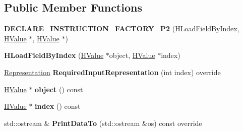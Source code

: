 \subsection*{Public Member Functions}
\begin{DoxyCompactItemize}
\item 
{\bfseries D\+E\+C\+L\+A\+R\+E\+\_\+\+I\+N\+S\+T\+R\+U\+C\+T\+I\+O\+N\+\_\+\+F\+A\+C\+T\+O\+R\+Y\+\_\+\+P2} (\hyperlink{classv8_1_1internal_1_1_h_load_field_by_index}{H\+Load\+Field\+By\+Index}, \hyperlink{classv8_1_1internal_1_1_h_value}{H\+Value} $\ast$, \hyperlink{classv8_1_1internal_1_1_h_value}{H\+Value} $\ast$)\hypertarget{classv8_1_1internal_1_1_h_load_field_by_index_ac6ebf1e76469e2e8f417ea83bd923131}{}\label{classv8_1_1internal_1_1_h_load_field_by_index_ac6ebf1e76469e2e8f417ea83bd923131}

\item 
{\bfseries H\+Load\+Field\+By\+Index} (\hyperlink{classv8_1_1internal_1_1_h_value}{H\+Value} $\ast$object, \hyperlink{classv8_1_1internal_1_1_h_value}{H\+Value} $\ast$index)\hypertarget{classv8_1_1internal_1_1_h_load_field_by_index_afb6884dfd41e4fd41b75e1f1cf66b80d}{}\label{classv8_1_1internal_1_1_h_load_field_by_index_afb6884dfd41e4fd41b75e1f1cf66b80d}

\item 
\hyperlink{classv8_1_1internal_1_1_representation}{Representation} {\bfseries Required\+Input\+Representation} (int index) override\hypertarget{classv8_1_1internal_1_1_h_load_field_by_index_a43f89025780fb71414a38eef3bef5af6}{}\label{classv8_1_1internal_1_1_h_load_field_by_index_a43f89025780fb71414a38eef3bef5af6}

\item 
\hyperlink{classv8_1_1internal_1_1_h_value}{H\+Value} $\ast$ {\bfseries object} () const \hypertarget{classv8_1_1internal_1_1_h_load_field_by_index_a094fdbdd17359e6cb98a240d12504f53}{}\label{classv8_1_1internal_1_1_h_load_field_by_index_a094fdbdd17359e6cb98a240d12504f53}

\item 
\hyperlink{classv8_1_1internal_1_1_h_value}{H\+Value} $\ast$ {\bfseries index} () const \hypertarget{classv8_1_1internal_1_1_h_load_field_by_index_ae9aeaa6cd8f29a1239230d2da5dd33cc}{}\label{classv8_1_1internal_1_1_h_load_field_by_index_ae9aeaa6cd8f29a1239230d2da5dd33cc}

\item 
std\+::ostream \& {\bfseries Print\+Data\+To} (std\+::ostream \&os) const  override\hypertarget{classv8_1_1internal_1_1_h_load_field_by_index_aa72ed71a888396e96f8ce57e87aca7aa}{}\label{classv8_1_1internal_1_1_h_load_field_by_index_aa72ed71a888396e96f8ce57e87aca7aa}


\end{DoxyCompactItemize}
